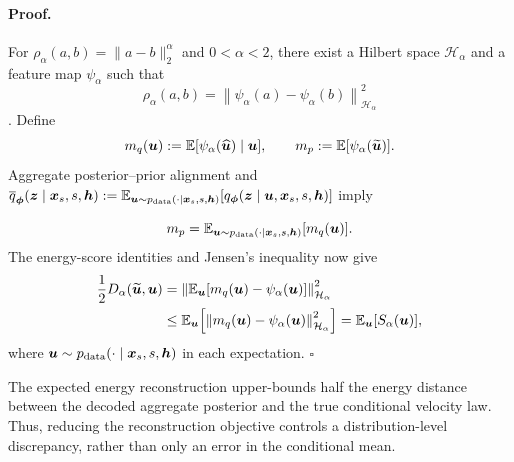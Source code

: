 \paragraph{Proof.}
For $\rho_\alpha(a,b)=\|a-b\|_2^\alpha$ and $0<\alpha<2$, there exist a
Hilbert space $\mathcal H_\alpha$ and a feature map $\psi_\alpha$ such that
\begin{equation*}
  \rho_\alpha(a,b)
  =
  \left\|\psi_\alpha(a)-\psi_\alpha(b)\right\|_{\mathcal H_\alpha}^2
\end{equation*}
\citep{gneiting2007strictly,szekely2013energy}. Define
\begin{equation*}
  m_q({\bm{u}})
  :=
  \mathbb{E}[\psi_\alpha(\widehat{{\bm{u}}})\mid{\bm{u}}],
  \qquad
  m_p
  :=
  \mathbb{E}[\psi_\alpha(\widetilde{{\bm{u}}})].
\end{equation*}
Aggregate posterior--prior alignment and
\(\overline q_{\boldsymbol{\phi}}({\bm{z}}\mid{\bm{x}}_s,s,{\bm{h}})
    :=
    \mathbb{E}_{{\bm{u}}\sim p_{\mathrm{data}}(\cdot\mid{\bm{x}}_s,s,{\bm{h}})}
    \!\left[
        q_{\boldsymbol{\phi}}({\bm{z}}\mid{\bm{u}},{\bm{x}}_s,s,{\bm{h}})
    \right]\) imply

\begin{equation*}
  m_p
  =
  \mathbb{E}_{{\bm{u}}\sim p_{\mathrm{data}}(\cdot\mid{\bm{x}}_s,s,{\bm{h}})}
  [m_q({\bm{u}})].
\end{equation*}
The energy-score identities and Jensen's inequality now give
\begin{align*}
  \frac12D_\alpha(\widetilde{{\bm{u}}},{\bm{u}})
  &=
  \left\|
    \mathbb{E}_{{\bm{u}}}
    \!\left[m_q({\bm{u}})-\psi_\alpha({\bm{u}})\right]
  \right\|_{\mathcal H_\alpha}^2
  \\
  &\leq
  \mathbb{E}_{{\bm{u}}}
  \!\left[
    \left\|m_q({\bm{u}})-\psi_\alpha({\bm{u}})\right\|_{\mathcal H_\alpha}^2
  \right]
  =
  \mathbb{E}_{{\bm{u}}}[S_\alpha({\bm{u}})],
\end{align*}
where ${\bm{u}}\sim p_{\mathrm{data}}(\cdot\mid{\bm{x}}_s,s,{\bm{h}})$ in each
expectation. \hfill$\square$


The expected energy reconstruction upper-bounds half the energy distance between the decoded aggregate posterior and the true conditional velocity law. Thus, reducing the reconstruction objective controls a distribution-level discrepancy, rather than only an error in the conditional mean.



